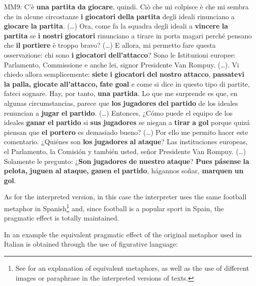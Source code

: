 \documentclass[output=paper]{langscibook}
\begin{document}
\ea\label{ex:mori:22}
\ea
MM9: C'è \textbf{una} \textbf{partita} \textbf{da} \textbf{giocare}, quindi. Ciò che mi colpisce è che mi sembra che in alcune circostanze \textbf{i} \textbf{giocatori} \textbf{della} \textbf{partita} degli ideali rinunciano a \textbf{giocare} \textbf{la} \textbf{partita}. (\ldots) Ora, come fa la squadra degli ideali a \textbf{vincere} \textbf{la} \textbf{partita} se \textbf{i} \textbf{nostri} \textbf{giocatori} rinunciano a tirare in porta magari perché pensano che \textbf{il} \textbf{portiere} è troppo bravo? (…) E allora, mi permetto fare questa osservazione: chi sono \textbf{i} \textbf{giocatori} \textbf{dell'attacco}? Sono le Istituzioni europee: Parlamento, Commissione e anche lei, signor Presidente Van Rompuy. (\ldots). Vi chiedo allora semplicemente: \textbf{siete} \textbf{i} \textbf{giocatori} \textbf{del} \textbf{nostro} \textbf{attacco}, \textbf{passatevi} \textbf{la} \textbf{palla,} \textbf{giocate} \textbf{all'attacco,} \textbf{fate} \textbf{goal} e come si dice in questo tipo di partite, fateci sognare.
\ex
Hay, por tanto, \textbf{una} \textbf{partida}. Lo que me surprende es que, en algunas circumstancias, parece que \textbf{los} \textbf{jugadores} \textbf{del} \textbf{partido} de los ideales renuncian a \textbf{jugar} \textbf{el} \textbf{partido}. (\ldots) Entonces, ¿Cómo puede el equipo de los ideales \textbf{ganar} \textbf{el} \textbf{partido} si \textbf{sus} \textbf{jugadores} se niegan a \textbf{tirar} \textbf{a} \textbf{gol} porque quizá piensan que \textbf{el} \textbf{portero} es demasiado bueno? (\ldots) Por ello me permito hacer este comentario. ¿Quiénes son \textbf{los} \textbf{jugadores} \textbf{al} \textbf{ataque}? Las instituciones europeas, el Parlamento, la Comisión y también usted, señor Presidente Van Rompuy. (\ldots) Solamente le pregunto: ¿\textbf{Son} \textbf{jugadores} \textbf{de} \textbf{nuestro} \textbf{ataque}? \textbf{Pues} \textbf{pásense} \textbf{la} \textbf{pelota,} \textbf{juguen} \textbf{al} \textbf{ataque,} \textbf{ganen} \textbf{el} \textbf{partido}, hágannos soñar, \textbf{marquen} \textbf{un} \textbf{gol}.
\z
\z

As for the interpreted version, in this case the interpreter uses the same football metaphor in Spanish\footnote{See \citet{Turrini2004} for an explanation of equivalent metaphors, as well as the use of different images or paraphrase in the interpreted versions of texts.} and, since football is a popular sport in Spain, the pragmatic effect is totally maintained. 

In  an example the equivalent pragmatic effect of the original metaphor used in Italian is obtained through the use of figurative language:
\end{document}
